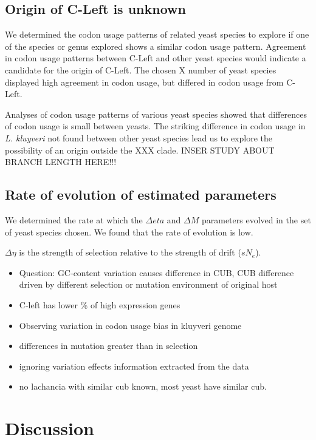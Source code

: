 \documentclass[12pt,draft]{article}
\begin{document}
\subsection*{Origin of C-Left is unknown}
We determined the codon usage patterns of related yeast species to explore if one of the species or genus explored shows a similar codon usage pattern.
Agreement in codon usage patterns between C-Left and other yeast species would indicate a candidate for the origin of C-Left.
The chosen X number of yeast species displayed high agreement in codon usage, but differed in codon usage from C-Left.

Analyses of codon usage patterns of various yeast species showed that differences of codon usage is small between yeasts.
The striking difference in codon usage in \textit{L. kluyveri} not found between other yeast species lead us to explore the possibility of an origin outside the XXX clade.
INSER STUDY ABOUT BRANCH LENGTH HERE!!! 

\subsection*{Rate of evolution of estimated parameters}
We determined the rate at which the $\Delta eta$ and $\Delta M$ parameters evolved in the set of yeast species chosen.
We found that the rate of evolution is low.

$\Delta \eta$ is the strength of selection relative to the strength of drift ($sN_e$).


\begin{itemize}
	\item Question: GC-content variation causes difference in CUB, CUB difference driven by different selection or mutation environment of original host
	\item C-left has lower \% of high expression genes
	\item Observing variation in codon usage bias in kluyveri genome
	\item differences in mutation greater than in selection
	\item ignoring variation effects information extracted from the data
	\item no lachancia with similar cub known, most yeast have similar cub.
\end{itemize}

\section*{Discussion}
\end{document}
